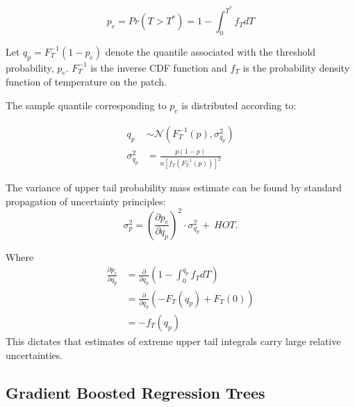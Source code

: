     \begin{equation}
    p_e = Pr(T > T^*) = 1 - \int_0^{T^*} f_T dT
    \label{eq:pr_thresh}
    \end{equation}
    
    Let $q_p = F_T^{-1}(1 - p_e)$
    denote the quantile associated with the threshold probability, $p_e$.
    $F_T^{-1}$ is the inverse CDF function and $f_T$ is the probability density function of temperature on the patch.
    
    The sample quantile corresponding to $p_e$ is distributed according to:

   \begin{eqnarray}
    q_p &\sim \mathcal N \left( F_T^{-1}(p), \sigma^2_{q_p} \right) \\
    \sigma^2_{q_p} &= \frac{p(1 - p)}{n[f_T(F_T^{-1}(p))]^2}
    \end{eqnarray}
    
    The variance of upper tail probability mass estimate can be found by standard propagation of uncertainty principles:
   \begin{equation}
    \sigma_p^2 = \left(\frac{\partial p_e}{\partial q_p} \right)^2 \cdot \sigma_{q_p}^2 +\  HOT.
    \end{equation}
    
    Where
   \begin{eqnarray}
    \frac{\partial p_e}{\partial q_p} &= \frac{\partial}{\partial q_p} \left( 1 - \int_0^{q_p} f_T dT \right) \nonumber \\
    &= \frac{\partial}{\partial q_p} \left( -F_T(q_p) + F_T(0) \right) \nonumber \\
    &= -f_T(q_p)
    \end{eqnarray}
    This dictates that estimates of extreme upper tail integrals carry large relative uncertainties.
    


\subsection{Gradient Boosted Regression Trees}
\label{chap:GBRT}

